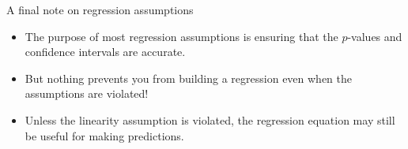 \documentclass{beamer}\usepackage[]{graphicx}\usepackage[]{color}
\begin{document}
\begin{darkframes}
    \begin{frame}{A final note on regression assumptions}
      \begin{itemize}[<+->]
        \item The purpose of most regression assumptions is ensuring that the $p$-values and confidence intervals are accurate.
        \item But nothing prevents you from building a regression even when the assumptions are violated!
        \item Unless the linearity assumption is violated, the regression equation may still be useful for making predictions.
      \end{itemize}
    \end{frame}


    
 
  \end{darkframes}
\end{document}
